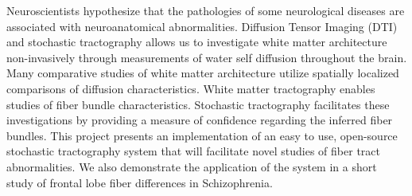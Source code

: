 % 
% 
%
Neuroscientists hypothesize that the pathologies of some neurological diseases are associated with neuroanatomical abnormalities.  Diffusion Tensor Imaging (DTI) and stochastic tractography allows us to investigate white matter architecture non-invasively through measurements of water self diffusion throughout the brain. Many comparative studies of white matter architecture utilize spatially localized comparisons of diffusion characteristics.  White matter tractography enables studies of fiber bundle characteristics.  Stochastic tractography facilitates these investigations by providing a measure of confidence regarding the inferred fiber bundles.  This project presents an implementation of an easy to use, open-source stochastic tractography system that will facilitate novel studies of fiber tract abnormalities.  We also demonstrate the application of the system in a short study of frontal lobe fiber differences in Schizophrenia.
